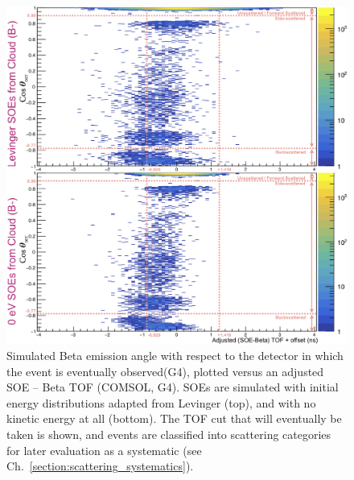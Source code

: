 \begin{figure}[h!tb]
	\centering
	\includegraphics[width=.999\linewidth]
	{Figures/fig_soe_tof_vs_costheta.png}
	\caption[Simulated Beta emission angle w.r.t. the detector vs adjusted SOE--Beta TOF]{Simulated Beta emission angle with respect to the detector in which the event is eventually observed(G4), plotted versus an adjusted SOE -- Beta TOF (COMSOL, G4).  SOEs are simulated with initial energy distributions adapted from Levinger (top), and with no kinetic energy at all (bottom).  
The TOF cut that will eventually be taken is shown, and events are classified into scattering categories for later evaluation as a systematic (see Ch.~\ref{section:scattering_systematics}).  }
	\label{fig:soe_tof_vs_costheta}
\end{figure}


